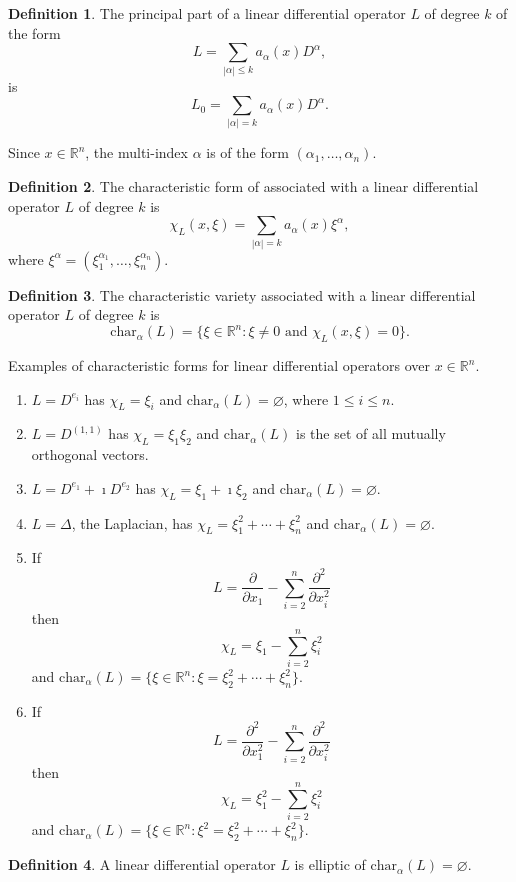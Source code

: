 \documentclass{article}
\newcommand{\cvar}[1]{\mathrm{char}_\alpha(#1)}
\theoremstyle{plain}
\numberwithin{thm}{section}
\theoremstyle{plain}
\numberwithin{prop}{section}
\theoremstyle{definition}
\newtheorem{defn}{Definition}
\numberwithin{defn}{section}
\theoremstyle{remark}
\numberwithin{equation}{section}
\begin{document}
\begin{defn}\label{s19d1}
The principal part of a linear differential operator $L$ of degree $k$ of the form
\[
L = \sum_{|\alpha| \le k} a_\alpha(x) D^\alpha,
\]
is 
\[
L_0 = \sum_{|\alpha| = k} a_\alpha(x) D^\alpha.
\]
\end{defn}

Since $x \in \mathbb{R}^n$, the multi-index $\alpha$ is of the form $(\alpha_1, \ldots, \alpha_n)$.
\begin{defn}\label{s19d2}
The characteristic form of associated with a linear differential operator $L$ of degree $k$ is
\[
\chi_L(x, \xi) = \sum_{|\alpha| = k} a_\alpha(x) \xi^\alpha,
\]
where $\xi^\alpha = (\xi_1^{\alpha_1}, \ldots, \xi_n^{\alpha_n})$.
\end{defn}

\begin{defn}\label{s19d3}
The characteristic variety associated with a linear differential operator $L$ of degree $k$ is
\[
\cvar{L} = \{\xi \in \mathbb{R}^n : \xi \ne 0 \text{ and } \chi_L(x, \xi) = 0\}.
\]
\end{defn}

Examples of characteristic forms for linear differential operators over $x \in \mathbb{R}^n$.
\begin{enumerate}
\item $L = D^{e_i}$ has $\chi_L = \xi_i$ and $\cvar{L} = \varnothing$, where $1 \le i \le n$.
\item $L = D^{(1,1)}$ has $\chi_L = \xi_1\xi_2$ and $\cvar{L}$ is the set of all mutually orthogonal
vectors.
\item $L = D^{e_1} + \imath D^{e_2}$ has $\chi_L = \xi_1 + \imath\xi_2$ and $\cvar{L} = \varnothing$.
\item $L = \Delta$, the Laplacian, has $\chi_L = \xi_1^2 + \cdots + \xi_n^2$ and $\cvar{L} = 
\varnothing$.
\item If 
\[
L = \frac{\partial}{\partial x_1} - \sum_{i=2}^n\frac{\partial^2}{\partial x_i^2}
\]
then 
\[
\chi_L = \xi_1 - \sum_{i=2}^n\xi_i^2
\]
and $\cvar{L} = \{\xi \in \mathbb{R}^n : \xi = \xi_2^2 + \cdots + \xi_n^2\}$.
\item If 
\[
L = \frac{\partial^2}{\partial x_1^2} - \sum_{i=2}^n\frac{\partial^2}{\partial x_i^2}
\]
then 
\[
\chi_L = \xi_1^2 - \sum_{i=2}^n\xi_i^2
\]
and $\cvar{L} = \{\xi \in \mathbb{R}^n : \xi^2 = \xi_2^2 + \cdots + \xi_n^2\}$.
\end{enumerate}

\begin{defn}\label{s19d4}
A linear differential operator $L$ is elliptic of $\cvar{L} = \varnothing$.
\end{defn}
\end{document}
